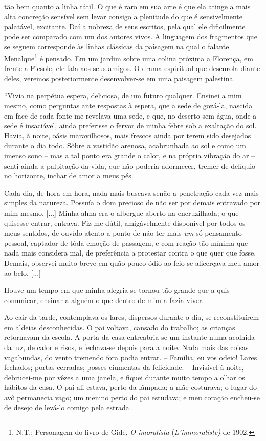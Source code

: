tão bem quanto a linha tátil. O que é raro em sua arte é que ela atinge
a mais alta concreção sensível sem levar consigo a plenitude do que é
sensivelmente palatável, excitante. Daí a nobreza de seus escritos, pela
qual ele dificilmente pode ser comparado com um dos autores vivos. A
linguagem dos fragmentos que se seguem corresponde às linhas clássicas
da paisagem na qual o falante Menalque\footnote{N.T.: Personagem do
  livro de Gide, \emph{O imoralista} (\emph{L'immoraliste)} de 1902.} é
pensado. Em um jardim sobre uma colina próxima a Florença, em frente a
Fiesole, ele fala aos seus amigos. O drama espiritual que desenrola
diante deles, veremos posteriormente desenvolver-se em uma paisagem
palestina.

``Vivia na perpétua espera, deliciosa, de um futuro qualquer. Ensinei a
mim mesmo, como perguntas ante respostas à espera, que a sede de
gozá-la, nascida em face de cada fonte me revelava uma sede, e que, no
deserto sem água, onde a sede é insaciável, ainda preferisse o fervor de
minha febre sob a exaltação do sol. Havia, à noite, oásis maravilhosos,
mais frescos ainda por terem sido desejados durante o dia todo. Sôbre a
vastidão arenosa, acabrunhada ao sol e como um imenso sono -- mas a tal
ponto era grande o calor, e na própria vibração do ar -- senti ainda a
palpitação da vida, que não poderia adormecer, tremer de delíquio no
horizonte, inchar de amor a meus pés.

Cada dia, de hora em hora, nada mais buscava senão a penetração cada vez
mais simples da natureza. Possuía o dom precioso de não ser por demais
entravado por mim mesmo. {[}...{]} Minha alma era o albergue aberto na
encruzilhada; o que quisesse entrar, entrava. Fiz-me dútil,
amigàvelmente disponível por todos os meus sentidos, de ouvido atento a
ponto de não ter mais \emph{um} só pensamento pessoal, captador de tôda
emoção de passagem, e com reação tão mínima que nada mais considera mal,
de preferência a protestar contra o que quer que fosse. Demais, observei
muito breve em quão pouco ódio ao feio se alicerçava meu amor ao belo.
{[}...{]}

Houve um tempo em que minha alegria se tornou tão grande que a quis
comunicar, ensinar a alguém o que dentro de mim a fazia viver.

Ao cair da tarde, contemplava os lares, dispersos durante o dia, se
reconstituírem em aldeias desconhecidas. O pai voltava, cansado do
trabalho; as crianças retornavam da escola. A porta da casa
entreabria-se um instante numa acolhida da luz, de calor e risos, e
fechava-se depois para a noite. Nada mais das coisas vagabundas, do
vento tremendo fora podia entrar. -- Família, eu vos odeio! Lares
fechados; portas cerradas; posses ciumentas da felicidade. -- Invisível
à noite, debrucei-me por vêzes a uma janela, e fiquei durante muito
tempo a olhar os hábitos da casa. O pai ali estava, perto da lâmpada; a
mãe costurava; o lugar do avô permanecia vago; um menino perto do pai
estudava; e meu coração encheu-se de desejo de levá-lo comigo pela
estrada.

